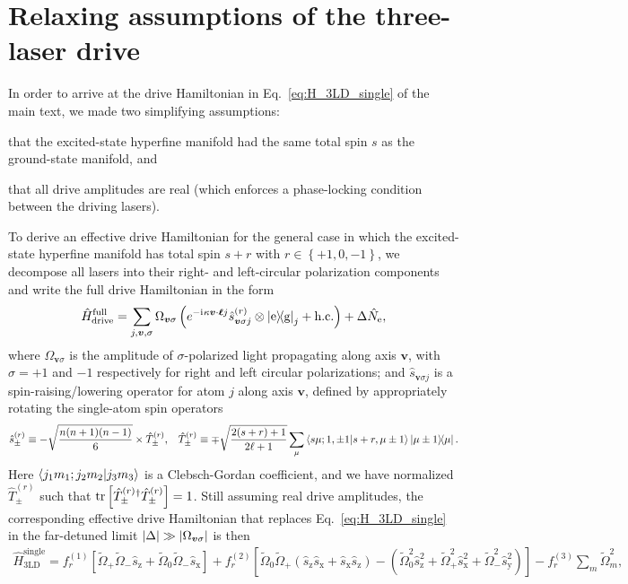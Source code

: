 \documentclass[aps,pra,nofootinbib,twocolumn,superscriptaddress]{revtex4-2}
\renewcommand{\t}{\text} %
\newcommand{\f}[2]{\dfrac{#1}{#2}} %
\newcommand{\p}[1]{\left(#1\right)} %
\renewcommand{\sp}[1]{\left[#1\right]} %
\renewcommand{\set}[1]{\left\{#1\right\}} %
\newcommand{\bk}{\braket} %
\renewcommand{\i}{\mathrm{i}\mkern1mu} %
\newcommand{\1}{\mathds{1}}
\newcommand{\s}{\hat{s}}
\renewcommand{\H}{\hat{H}}
\newcommand{\x}{\text{x}}
\newcommand{\y}{\text{y}}
\newcommand{\z}{\text{z}}
\newcommand{\g}{\text{g}}
\newcommand{\e}{\text{e}}
\begin{document}
\section{Relaxing assumptions of the three-laser drive}
\label{sec:full_drive}

In order to arrive at the drive Hamiltonian in Eq.~\eqref{eq:H_3LD_single} of the main text, we made two simplifying assumptions:
\begin{enumerate*}
\item that the excited-state hyperfine manifold had the same total spin $s$ as the ground-state manifold, and
\item that all drive amplitudes are real (which enforces a phase-locking condition between the driving lasers).
\end{enumerate*}
To derive an effective drive Hamiltonian for the general case in which the excited-state hyperfine manifold has total spin $s+r$ with $r\in\set{+1,0,-1}$, we decompose all lasers into their right- and left-circular polarization components and write the full drive Hamiltonian in the form
\begin{align}
  \H_{\t{drive}}^{\t{full}}
  = \sum_{j,\bm{v},\sigma} \Omega_{\bm{v}\sigma}
  \p{e^{-\i\kappa\bm{v}\cdot\bm\ell j} \s_{\bm{v}\sigma j}^{(r)}
    \otimes\op{\e}{\g}_j + \t{h.c.}}
  + \Delta \hat{N}_\e,
\end{align}
where $\Omega_{\bm{v}\sigma}$ is the amplitude of $\sigma$-polarized light propagating along axis $\bm{v}$, with $\sigma=+1$ and $-1$ respectively for right and left circular polarizations; and $\s_{\bm{v}\sigma j}$ is a spin-raising/lowering operator for atom $j$ along axis $\bm{v}$, defined by appropriately rotating the single-atom spin operators
\begin{align}
  \s_\pm^{(r)}
  \equiv -\sqrt{\f{n(n+1)(n-1)}{6}} \times \hat{T}_\pm^{(r)},
  &&
  \hat{T}_\pm^{(r)} \equiv \mp\sqrt{\f{2(s+r)+1}{2\ell+1}}
  \sum_\mu \bk{s\mu;1,\pm1|s+r,\mu\pm1} \op{\mu\pm1}{\mu}.
\end{align}
Here $\bk{j_1m_1;j_2m_2|j_3m_3}$ is a Clebsch-Gordan coefficient, and we have normalized $\hat{T}_\pm^{(r)}$ such that $\tr\sp{\hat{T}_\pm^{(r)}{}^\dag \hat{T}_\pm^{(r)}}=1$.
Still assuming real drive amplitudes, the corresponding effective drive Hamiltonian that replaces Eq.~\eqref{eq:H_3LD_single} in the far-detuned limit $\abs{\Delta}\gg\abs{\Omega_{\bm{v}\sigma}}$ is then
\begin{align}
  \H_{\t{3LD}}^{\t{single}}
  = f_r^{(1)} \sp{\tilde\Omega_+ \tilde\Omega_- \s_\z
    + \tilde\Omega_0 \tilde\Omega_- \s_\x}
  + f_r^{(2)} \sp{\tilde\Omega_0 \tilde\Omega_+
    (\s_\z \s_\x  + \s_\x \s_\z)
    - \p{\tilde\Omega_0^2 \s_\z^2
      + \tilde\Omega_+^2 \s_\x^2
      + \tilde\Omega_-^2 \s_\y^2}}
  - f_r^{(3)} \sum_m \tilde\Omega_m^2,
\end{align}
\end{document}
